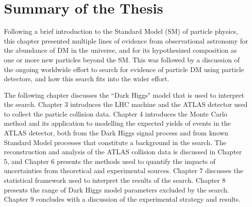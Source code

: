 \section{Summary of the Thesis}

Following a brief introduction to the Standard Model (SM) of particle physics, this chapter presented multiple lines of evidence from observational astronomy for the abundance of DM in the universe, and for its hypothesized composition as one or more new particles beyond the SM. This was followed by a discussion of the ongoing worldwide effort to search for evidence of particle DM using particle detectors, and how this search fits into the wider effort. 

The following chapter discusses the ``Dark Higgs" model that is used to interpret the search. Chapter 3 introduces the LHC machine and the ATLAS detector used to collect the particle collision data. Chapter 4 introduces the Monte Carlo method and its application to modelling the expected yields of events in the ATLAS detector, both from the Dark Higgs signal process and from known Standard Model processes that constitute a background in the search. The reconstruction and analysis of the ATLAS collision data is discussed in Chapter 5, and Chapter 6 presents the methods used to quantify the impacts of uncertainties from theoretical and experimental sources. Chapter 7 discusses the statistical framework used to interpret the results of the search. Chapter 8 presents the range of Dark Higgs model parameters excluded by the search. Chapter 9 concludes with a discussion of the experimental strategy and results. 

